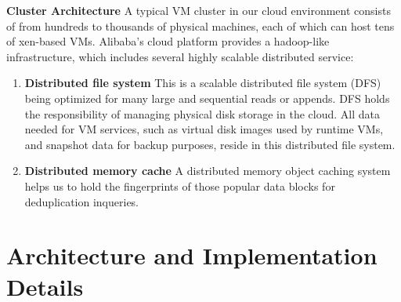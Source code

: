 {%
{\bf Cluster Architecture}
A typical VM cluster in our cloud environment
consists of from hundreds to thousands of physical machines, each of which can
host tens of xen-based\cite{Barham2003} VMs.
Alibaba's cloud platform provides a hadoop-like infrastructure, 
which includes several highly scalable distributed service:
\begin{enumerate}
\item {\bf Distributed file system} This is a scalable distributed file system (DFS) being optimized for many large and sequential reads or appends. DFS holds the responsibility of managing physical disk storage
in the cloud. All data needed for VM services, such as virtual disk images used by runtime VMs,
and snapshot data for backup purposes, reside in this distributed file system. 
\item {\bf Distributed memory cache} A distributed memory object caching system helps us to hold the fingerprints of those popular data blocks for deduplication inqueries. 
\end{enumerate}
}

\section{Architecture and Implementation Details}



